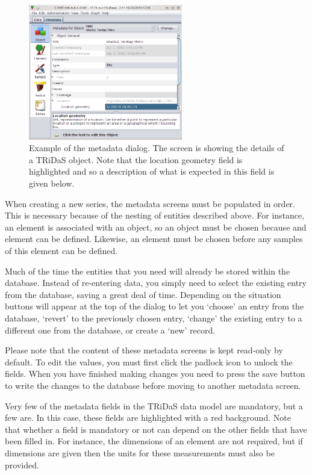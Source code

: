 \begin{figure}
\centering
\includegraphics[width=0.6\textwidth]{Images/metadata.png}
\caption{Example of the metadata dialog.  The screen is showing the details of a TRiDaS object.  Note that the location geometry field is highlighted and so a description of what is expected in this field is given below.} 
\label{fig:metadata}
\end{figure}

When creating a new series, the metadata screens must be populated in order.  This is necessary because of the nesting of entities described above.  For instance, an element is associated with an object, so an object must be chosen because and element can be defined.  Likewise, an element must be chosen before any samples of this element can be defined.  

Much of the time the entities that you need will already be stored within the database.  Instead of re-entering data, you simply need to select the existing entry from the database, saving a great deal of time.  Depending on the situation buttons will appear at the top of the dialog to let you `choose' an entry from the database, `revert' to the previously chosen entry, `change' the existing entry to a different one from the database, or create a `new' record.

Please note that the content of these metadata screens is kept read-only by default.  To edit the values, you must first click the padlock icon to unlock the fields.  When you have finished making changes you need to press the save button to write the changes to the database before moving to another metadata screen.

Very few of the metadata fields in the TRiDaS data model are mandatory, but a few are.  In this case, these fields are highlighted with a red background.  Note that whether a field is mandatory or not can depend on the other fields that have been filled in.  For instance, the dimensions of an element are not required, but if dimensions are given then the units for these measurements must also be provided.

